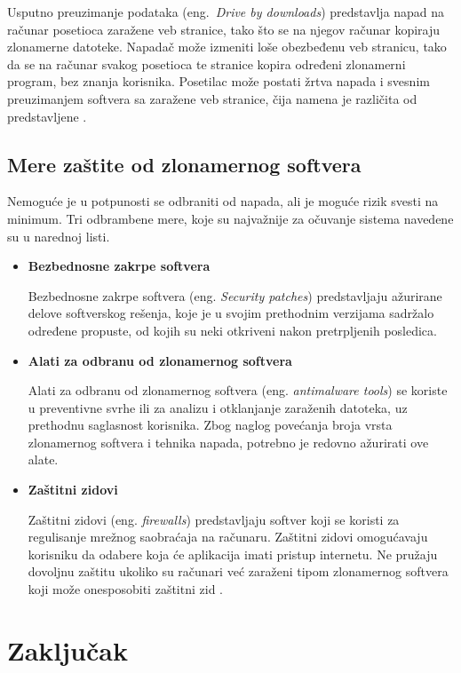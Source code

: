 \documentclass[a4paper]{article}
\begin{document}
Usputno preuzimanje podataka (eng.~{\em Drive by downloads}) predstavlja napad na računar posetioca zaražene veb stranice, tako što se na njegov računar kopiraju zlonamerne datoteke. Napadač može izmeniti
loše obezbeđenu veb stranicu, tako da se na računar 
svakog posetioca te stranice kopira određeni 
zlonamerni program, bez znanja korisnika. Posetilac 
može postati žrtva napada i svesnim preuzimanjem 
softvera sa zaražene veb stranice, čija namena je 
različita od predstavljene \cite{drivebydownloads, ethics}.

\subsection{Mere zaštite od zlonamernog softvera}

Nemoguće je u potpunosti se odbraniti od napada, ali je moguće rizik svesti na minimum. Tri odbrambene mere, koje su najvažnije za očuvanje sistema navedene su u narednoj listi. 

\begin{itemize}
\item \textbf{Bezbednosne zakrpe softvera}

Bezbednosne zakrpe softvera (eng. \textit{Security patches}) predstavljaju ažurirane delove softverskog 
rešenja, koje je u svojim prethodnim verzijama sadržalo određene propuste, od kojih su neki otkriveni nakon pretrpljenih posledica.


\item \textbf{Alati za odbranu od zlonamernog softvera}

Alati za odbranu od zlonamernog softvera (eng. \textit{antimalware tools}) se koriste u preventivne svrhe ili za analizu i otklanjanje zaraženih datoteka, uz prethodnu saglasnost korisnika. Zbog naglog povećanja broja vrsta zlonamernog softvera i tehnika napada, potrebno je redovno ažurirati ove alate.

\item \textbf{Zaštitni zidovi}

Zaštitni zidovi (eng. \textit{firewalls}) predstavljaju softver koji se koristi za regulisanje mrežnog saobraćaja na računaru. Zaštitni zidovi omogućavaju korisniku da odabere koja će aplikacija imati pristup internetu. Ne pružaju dovoljnu zaštitu ukoliko su računari već zaraženi tipom zlonamernog softvera koji može onesposobiti zaštitni zid \cite{ethics}.

\end{itemize}

\section{Zaključak}
\label{sec:zakljucak}
\end{document}
